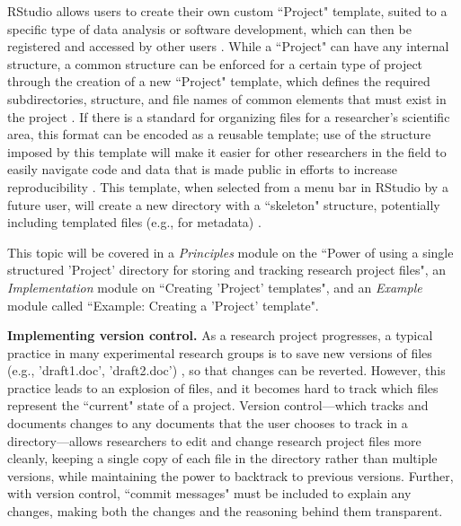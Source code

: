 \documentclass[pdftex,english,11pt,parskip=half]{scrartcl}
\begin{document}
RStudio allows users to create their own
custom ``Project" template, suited to a specific type of data analysis or
software development, which can then be registered and accessed by other users
\cite{rstudioprojecttemplate}. While a ``Project" can have any internal
structure, a common structure can be enforced for a certain type of project
through the creation of a new ``Project" template, which defines the required
subdirectories, structure, and file names of common elements that must exist in
the project \cite{rstudioprojecttemplate}. If there is a standard for organizing files for a researcher's scientific area, this format can be encoded as a reusable template; use of the structure imposed by this template will make it easier for other researchers in the field to easily navigate code and data that is made public in efforts to increase reproducibility \cite{marwick2018packaging}. This template, when selected from a menu bar  in RStudio by a
future user, will create a new directory with a ``skeleton" structure,
potentially including templated files (e.g., for metadata) \cite{rstudioprojecttemplate}.

This topic will be
covered in a \textit{Principles} module on the ``Power of using a single
structured 'Project' directory for storing and tracking research project files",
an \textit{Implementation} module on ``Creating 'Project' templates", and an
\textit{Example} module called ``Example: Creating a 'Project' template".

\textbf{Implementing version control.} As a research project progresses, a typical practice in many experimental research groups is to save new versions of files (e.g., 'draft1.doc', 'draft2.doc') \cite{bryan2018excuse}, so that changes can be reverted. However, this practice leads to an explosion of files, and it becomes hard to track which files represent the ``current" state of a project. Version control---which tracks and documents changes to any documents that the user chooses to track in a directory---allows researchers to edit and change research project files more cleanly, keeping a single copy of each file in the directory rather than multiple versions, while maintaining the power to backtrack to previous versions. Further, with version control, ``commit messages" must be included to explain any changes, making both the changes and the reasoning behind them transparent. 
\end{document}

